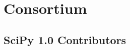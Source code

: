 \documentclass[fleqn,10pt]{wlscirep}
\begin{document}





\section*{Consortium}
\subsection*{SciPy 1.0 Contributors}

\end{document}

